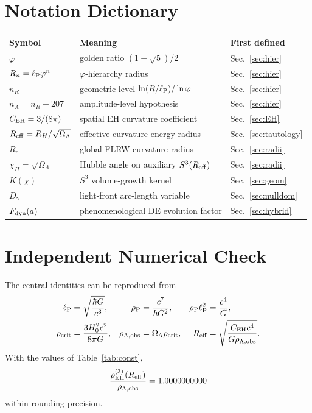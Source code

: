 \documentclass[11pt,a4paper]{article}
\newcommand{\vph}{\varphi}
\newcommand{\ellP}{\ell_{\rm P}}
\newcommand{\rhoP}{\rho_{\rm P}}
\newcommand{\rhoL}{\rho_{\Lambda,{\rm obs}}}
\newcommand{\rhoC}{\rho_{\rm crit}}
\newcommand{\RH}{R_H}
\newcommand{\Reff}{R_{\rm eff}}
\newcommand{\OmL}{\Omega_\Lambda}
\newcommand{\CEH}{C_{\rm EH}}
\begin{document}
\section{Notation Dictionary}
\label{app:notation}

\begin{center}
\small
\begin{tabular}{@{}lll@{}}
\toprule
Symbol & Meaning & First defined \\
\midrule
$\vph$ & golden ratio $(1+\sqrt5)/2$ & Sec.~\ref{sec:hier} \\
$R_n=\ellP\vph^n$ & $\vph$-hierarchy radius & Sec.~\ref{sec:hier} \\
$n_R$ & geometric level $\ln(R/\ellP)/\ln\vph$ & Sec.~\ref{sec:hier} \\
$n_A=n_R-207$ & amplitude-level hypothesis & Sec.~\ref{sec:hier} \\
$\CEH=3/(8\pi)$ & spatial EH curvature coefficient & Sec.~\ref{sec:EH} \\
$\Reff=\RH/\sqrt{\OmL}$ & effective curvature-energy radius & Sec.~\ref{sec:tautology} \\
$R_c$ & global FLRW curvature radius & Sec.~\ref{sec:radii} \\
$\chi_H=\sqrt{\OmL}$ & Hubble angle on auxiliary $S^3(\Reff)$ & Sec.~\ref{sec:radii} \\
$K(\chi)$ & $S^3$ volume-growth kernel & Sec.~\ref{sec:geom} \\
$D_\gamma$ & light-front arc-length variable & Sec.~\ref{sec:nulldom} \\
$F_{\rm dyn}(a)$ & phenomenological DE evolution factor & Sec.~\ref{sec:hybrid} \\
\bottomrule
\end{tabular}
\end{center}

\section{Independent Numerical Check}
\label{app:numeric}

The central identities can be reproduced from
\begin{align}
\ellP&=\sqrt{\frac{\hbar G}{c^3}},
&\rhoP&=\frac{c^7}{\hbar G^2},
&\rhoP\ellP^2&=\frac{c^4}{G},\\
\rhoC&=\frac{3H_0^2c^2}{8\pi G},
&\rhoL&=\OmL\rhoC,
&\Reff&=\sqrt{\frac{\CEH c^4}{G\rhoL}}.
\end{align}
With the values of Table~\ref{tab:const},
\begin{equation}
\frac{\rho_{\rm EH}^{(3)}(\Reff)}{\rhoL}=1.0000000000
\end{equation}
within rounding precision.
\end{document}
